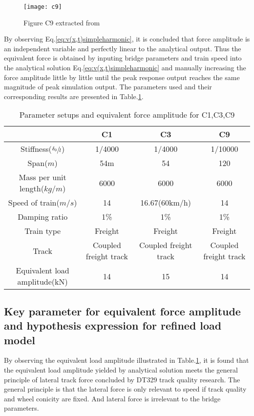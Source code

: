 \begin{figure}[h!]
    \centering
    \texttt{[image: c9]}
    \caption{Figure C9 extracted from \cite{d181dt329} }
    \label{fig:c9}
\end{figure}

By observing Eq.\ref{eq:v(x,t)simpleharmonic}, it is concluded that force amplitude is an independent variable and perfectly linear to the analytical output. Thus the equivalent force is obtained by inputing bridge parameters and train speed into the analytical solution Eq.\ref{eq:v(x,t)simpleharmonic} and manually increasing the force amplitude little by little until the peak response output reaches the same magnitude of peak simulation output. The parameters used and their corresponding results are presented in Table.\ref{tab:parametersetupsandequivalentforce}.


\begin{table}[h!]
    \centering
    \caption{Parameter setups and equivalent force amplitude for C1,C3,C9}
    \begin{tabular}{c|ccc}
        \hline
        & C1 & C3 & C9 \\
        \hline
        Stiffness($\sfrac{\delta_0}{l}$) & 1/4000 & 1/4000 & 1/10000 \\
        Span($m$) & 54m & 54 & 120 \\ 
        Mass per unit length($kg/m$) & 6000 & 6000 & 6000\\
        Speed of train($m/s$) & 14 & 16.67(60km/h) & 14\\
        Damping ratio & 1\% & 1\% & 1\%\\
        Train type & Freight & Freight & Freight \\
        Track & Coupled freight track & Coupled freight track & Coupled freight track \\
        \hline
        Equivalent load amplitude(kN) & 14 & 15 & 14 \\
        \hline
    \end{tabular}
    \label{tab:parametersetupsandequivalentforce}
\end{table}

\subsection{Key parameter for equivalent force amplitude and hypothesis expression for refined load model}\label{sec:keyparameterforequivalentamplitudeandhypothesis}

By observing the equivalent load amplitude illustrated in Table.\ref{tab:parametersetupsandequivalentforce}, it is found that the equivalent load amplitude yielded by analytical solution meets the general principle of lateral track force concluded by DT329 track quality research. The general principle is that the lateral force is only relevant to speed if track quality and wheel conicity are fixed. And lateral force is irrelevant to the bridge parameters.
 
